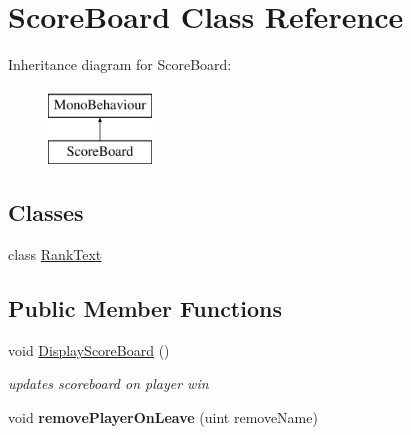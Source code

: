 \hypertarget{class_score_board}{\section{Score\-Board Class Reference}
\label{class_score_board}
}
Inheritance diagram for Score\-Board\-:\begin{figure}[H]
\begin{center}
\leavevmode
\includegraphics[height=2.000000cm]{class_score_board}
\end{center}
\end{figure}
\subsection*{Classes}
\begin{DoxyCompactItemize}
\item 
class \hyperlink{class_score_board_1_1_rank_text}{Rank\-Text}
\end{DoxyCompactItemize}
\subsection*{Public Member Functions}
\begin{DoxyCompactItemize}
\item 
void \hyperlink{class_score_board_a67bd4682926000724ae01e01c3e79f66}{Display\-Score\-Board} ()
\begin{DoxyCompactList}\small\item\em updates scoreboard on player win \end{DoxyCompactList}\item 
\hypertarget{class_score_board_a5ece9a1f2b00f8f91715f62ff50e7143}{void {\bfseries remove\-Player\-On\-Leave} (uint remove\-Name)}\label{class_score_board_a5ece9a1f2b00f8f91715f62ff50e7143}

\end{DoxyCompactItemize}
